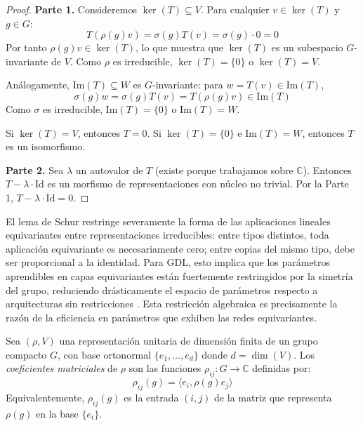 \begin{proof}
\textbf{Parte 1.} Consideremos $\ker(T) \subseteq V$. Para cualquier $v \in \ker(T)$ y $g \in G$:
\[
T(\rho(g)v) = \sigma(g)T(v) = \sigma(g) \cdot 0 = 0
\]
Por tanto $\rho(g)v \in \ker(T)$, lo que muestra que $\ker(T)$ es un subespacio $G$-invariante de $V$. Como $\rho$ es irreducible, $\ker(T) = \{0\}$ o $\ker(T) = V$.

Análogamente, $\mathrm{Im}(T) \subseteq W$ es $G$-invariante: para $w = T(v) \in \mathrm{Im}(T)$,
\[
\sigma(g)w = \sigma(g)T(v) = T(\rho(g)v) \in \mathrm{Im}(T)
\]
Como $\sigma$ es irreducible, $\mathrm{Im}(T) = \{0\}$ o $\mathrm{Im}(T) = W$.

Si $\ker(T) = V$, entonces $T = 0$. Si $\ker(T) = \{0\}$ e $\mathrm{Im}(T) = W$, entonces $T$ es un isomorfismo.

\textbf{Parte 2.} Sea $\lambda$ un autovalor de $T$ (existe porque trabajamos sobre $\mathbb{C}$). Entonces $T - \lambda \cdot \mathrm{Id}$ es un morfismo de representaciones con núcleo no trivial. Por la Parte 1, $T - \lambda \cdot \mathrm{Id} = 0$.
\end{proof}

El lema de Schur restringe severamente la forma de las aplicaciones lineales equivariantes entre representaciones irreducibles: entre tipos distintos, toda aplicación equivariante es necesariamente cero; entre copias del mismo tipo, debe ser proporcional a la identidad. Para \gls{GDL}, esto implica que los parámetros aprendibles en capas equivariantes están fuertemente restringidos por la simetría del grupo, reduciendo drásticamente el espacio de parámetros respecto a arquitecturas sin restricciones \citep{cohen2016steerablecnns}. Esta restricción algebraica es precisamente la razón de la eficiencia en parámetros que exhiben las redes equivariantes.

\begin{definition}\label{def:coeficientes_matriciales}
Sea $(\rho, V)$ una representación unitaria de dimensión finita de un grupo compacto $G$, con base ortonormal $\{e_1, \ldots, e_d\}$ donde $d = \dim(V)$. Los \textit{coeficientes matriciales} de $\rho$ son las funciones $\rho_{ij}: G \to \mathbb{C}$ definidas por:
\begin{equation}
\rho_{ij}(g) = \langle e_i, \rho(g) e_j \rangle
\end{equation}
Equivalentemente, $\rho_{ij}(g)$ es la entrada $(i,j)$ de la matriz que representa $\rho(g)$ en la base $\{e_i\}$.
\end{definition}

